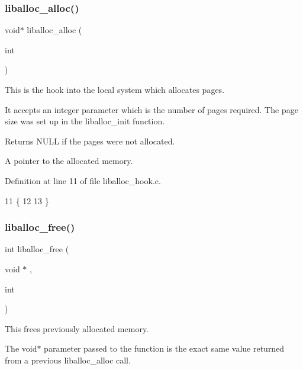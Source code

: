 \subsubsection{\texorpdfstring{liballoc\+\_\+alloc()}{liballoc\_alloc()}}
{\footnotesize\ttfamily void$\ast$ liballoc\+\_\+alloc (\begin{DoxyParamCaption}\item[{int}]{ }\end{DoxyParamCaption})}



This is the hook into the local system which allocates pages. 

It accepts an integer parameter which is the number of pages required. The page size was set up in the liballoc\+\_\+init function.

\begin{DoxyReturn}{Returns}
N\+U\+LL if the pages were not allocated. 

A pointer to the allocated memory. 
\end{DoxyReturn}


Definition at line 11 of file liballoc\+\_\+hook.\+c.


\begin{DoxyCode}
11                                 \{
12 
13 \}
\end{DoxyCode}
\mbox{\label{a00041_aee2dc12f19409f4a76b2aa36f5ab1316_aee2dc12f19409f4a76b2aa36f5ab1316}} 
\subsubsection{\texorpdfstring{liballoc\+\_\+free()}{liballoc\_free()}}
{\footnotesize\ttfamily int liballoc\+\_\+free (\begin{DoxyParamCaption}\item[{void $\ast$}]{,  }\item[{int}]{ }\end{DoxyParamCaption})}



This frees previously allocated memory. 

The void$\ast$ parameter passed to the function is the exact same value returned from a previous liballoc\+\_\+alloc call.

